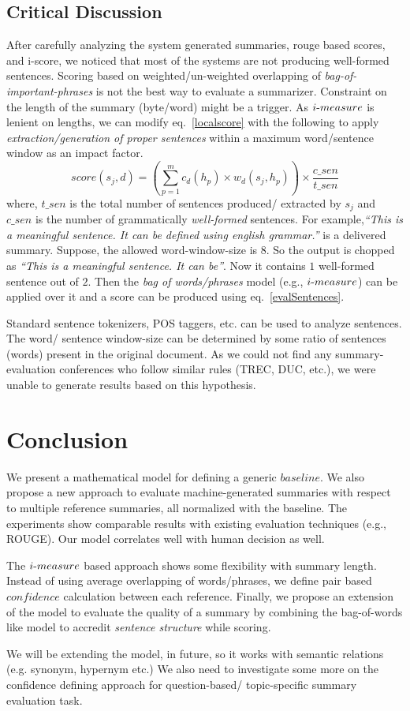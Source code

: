 \documentclass[a4paper]{report}
\begin{document}
\subsection{Critical Discussion}
After carefully analyzing the system generated summaries, rouge based scores, and i-score, we noticed that most of the systems are not producing well-formed sentences. Scoring based on weighted/un-weighted overlapping of \emph{bag-of-important-phrases} is not the best way to evaluate a summarizer. Constraint on the length of the summary (byte/word) might be a trigger. As $i\hbox{-}measure$ is lenient on lengths, we can modify eq.~\ref{localscore} with the following to apply \emph{extraction/generation of proper sentences} within a maximum word/sentence window as an impact factor.
\begin{equation}
\label{evalSentences}
score(s_j, d) = \left(\sum_{p=1}^mc_d{(h_p)} \times w_d(s_j,h_p)\right) \times \frac{c\_sen}{t\_sen}
\end{equation}
where, $t\_sen$ is the total number of sentences produced/ extracted by $s_j$ and $c\_sen$ is the number of grammatically \emph{well-formed} sentences. For example,\emph{``This is a meaningful sentence. It can be defined using english grammar.''} is a delivered summary. Suppose, the allowed word-window-size is $8$. So the output is chopped as \emph{``This is a meaningful sentence. It can be''}. Now it contains $1$ well-formed sentence out of $2$. Then the \emph{bag of words/phrases} model (e.g., $i\hbox{-}measure$) can be applied over it and a score can be produced using eq.~\ref{evalSentences}. 
\par Standard sentence tokenizers, POS taggers, etc. can be used to analyze sentences. The word/ sentence window-size can be determined by some ratio of sentences (words) present in the original document. As we could not find any summary-evaluation conferences who follow similar rules (TREC, DUC, etc.), we were unable to generate results based on this hypothesis.
\section{Conclusion}
We present a mathematical model for defining a generic $baseline$. We also propose a new approach to evaluate machine-generated summaries with respect to multiple reference summaries, all normalized with the baseline. The experiments show comparable results with existing evaluation techniques (e.g., ROUGE). Our model correlates well with human decision as well.
\par The $i\hbox{-}measure$ based approach shows some flexibility with summary length. Instead of using average overlapping of words/phrases, we define pair based $confidence$ calculation between each reference. Finally, we propose an extension of the model  to evaluate the quality of a summary by combining the bag-of-words like model to accredit \emph{sentence structure} while scoring. 
\par We will be extending the model, in future, so it works  with semantic relations (e.g. synonym, hypernym etc.) We also need to investigate some more on the confidence defining approach for question-based/ topic-specific summary evaluation task.    
\end{document}
